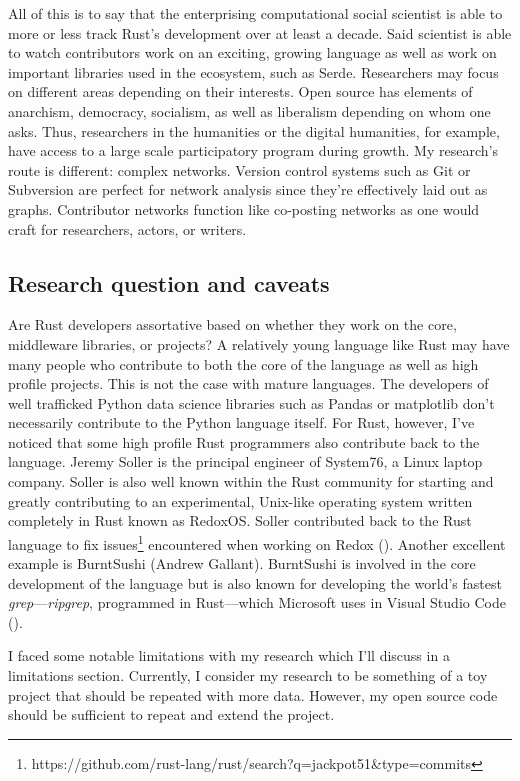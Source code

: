 \documentclass[12pt, a4paper]{article}
\begin{document}
All of this is to say that the enterprising computational social scientist is able to more or less track Rust's development over at least a decade. Said scientist is able to watch contributors work on an exciting, growing language as well as work on important libraries used in the ecosystem, such as Serde. Researchers may focus on different areas depending on their interests. Open source has elements of anarchism, democracy, socialism, as well as liberalism depending on whom one asks. Thus, researchers in the humanities or the digital humanities, for example, have access to a large scale participatory program during growth. My research's route is different: complex networks. Version control systems such as Git or Subversion are perfect for network analysis since they're effectively laid out as graphs. Contributor networks function like co-posting networks as one would craft for researchers, actors, or writers.

\subsection{Research question and caveats}
Are Rust developers assortative based on whether they work on the core, middleware libraries, or projects? A relatively young language like Rust may have many people who contribute to both the core of the language as well as high profile projects. This is not the case with mature languages. The developers of well trafficked Python data science libraries such as Pandas or matplotlib don't necessarily contribute to the Python language itself. For Rust, however, I've noticed that some high profile Rust programmers also contribute back to the language. Jeremy Soller is the principal engineer of System76, a Linux laptop company. Soller is also well known within the Rust community for starting and greatly contributing to an experimental, Unix-like operating system written completely in Rust known as RedoxOS. Soller contributed back to the Rust language to fix issues\footnote{https://github.com/rust-lang/rust/search?q=jackpot51&type=commits} encountered when working on Redox (\cite{lunduke31317}). Another excellent example is BurntSushi (Andrew Gallant). BurntSushi is involved in the core development of the language but is also known for developing the world's fastest \textit{grep}---\textit{ripgrep}, programmed in Rust---which Microsoft uses in Visual Studio Code (\cite{gallant2016}).

I faced some notable limitations with my research which I'll discuss in a limitations section. Currently, I consider my research to be something of a toy project that should be repeated with more data. However, my open source code should be sufficient to repeat and extend the project.
\end{document}
